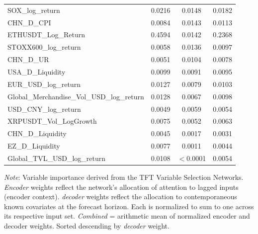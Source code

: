\begin{tabular}{lccc}
  SOX\_log\_return & 0.0216 & 0.0148 & 0.0182 \\ 
  CHN\_D\_CPI & 0.0084 & 0.0143 & 0.0113 \\ 
  ETHUSDT\_Log\_Return & 0.4594 & 0.0142 & 0.2368 \\ 
  STOXX600\_log\_return & 0.0058 & 0.0136 & 0.0097 \\ 
  CHN\_D\_UR & 0.0051 & 0.0104 & 0.0078 \\ 
  USA\_D\_Liquidity & 0.0099 & 0.0091 & 0.0095 \\ 
  EUR\_USD\_log\_return & 0.0127 & 0.0079 & 0.0103 \\ 
  Global\_Merchandise\_Vol\_USD\_log\_return & 0.0128 & 0.0067 & 0.0098 \\ 
  USD\_CNY\_log\_return & 0.0049 & 0.0059 & 0.0054 \\ 
  XRPUSDT\_Vol\_LogGrowth & 0.0075 & 0.0052 & 0.0063 \\ 
  CHN\_D\_Liquidity & 0.0045 & 0.0017 & 0.0031 \\ 
  EZ\_D\_Liquidity & 0.0077 & 0.0011 & 0.0044 \\ 
  Global\_TVL\_USD\_log\_return & 0.0108 & $<$0.0001 & 0.0054 \\ 
  \bottomrule
\end{tabular}
\par\vspace{4pt}
\begin{minipage}{\linewidth}
  \footnotesize \textit{Note}: Variable importance derived from the TFT Variable Selection Networks. \textit{Encoder} weights reflect the network's allocation of attention to lagged inputs (encoder context). \textit{decoder} weights reflect the allocation to contemporaneous known covariates at the forecast horizon. Each is normalized to sum to one across its respective input set. \textit{Combined} = arithmetic mean of normalized encoder and decoder weights. Sorted descending by \textit{decoder} weight.
\end{minipage}